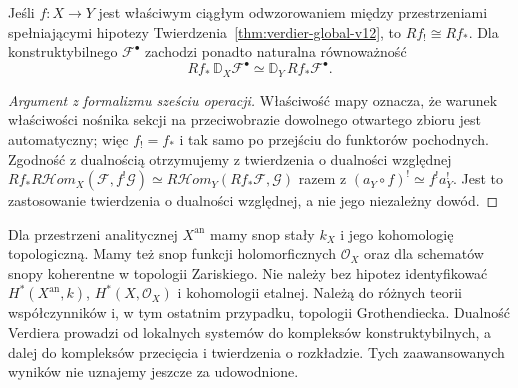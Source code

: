 \begin{stwierdzenie}
\label{prop:verdier-proper-v12}
Jeśli $f:X\to Y$ jest właściwym ciągłym odwzorowaniem
między przestrzeniami spełniającymi hipotezy
Twierdzenia~\ref{thm:verdier-global-v12}, to
$Rf_!\cong Rf_*$. Dla konstruktybilnego
$\mathcal F^\bullet$ zachodzi ponadto naturalna
równoważność
\[
Rf_*\,\mathbb D_X\mathcal F^\bullet
\simeq\mathbb D_Y\,Rf_*\mathcal F^\bullet.
\]
\end{stwierdzenie}
\begin{proof}[Argument z formalizmu sześciu operacji]
Właściwość mapy oznacza, że warunek właściwości
nośnika sekcji na przeciwobrazie dowolnego otwartego
zbioru jest automatyczny; więc $f_!=f_*$ i tak samo
po przejściu do funktorów pochodnych. Zgodność z dualnością
otrzymujemy z twierdzenia o dualności względnej
$Rf_*R\mathcal Hom_X(\mathcal F,f^!\mathcal G)
\simeq R\mathcal Hom_Y(Rf_*\mathcal F,\mathcal G)$
razem z $(a_Y\circ f)^!\simeq f^!a_Y^!$.
Jest to zastosowanie twierdzenia o dualności względnej,
a nie jego niezależny dowód.
\end{proof}

\begin{uwaga}
Dla przestrzeni analitycznej $X^{\mathrm{an}}$ mamy snop
stały $k_X$ i jego kohomologię topologiczną. Mamy też
snop funkcji holomorficznych $\mathcal O_X$ oraz dla
schematów snopy koherentne w topologii Zariskiego.
Nie należy bez hipotez identyfikować
$H^*(X^{\mathrm{an}},k)$, $H^*(X,\mathcal O_X)$
i kohomologii etalnej. Należą do różnych teorii
współczynników i, w tym ostatnim przypadku,
topologii Grothendiecka. Dualność Verdiera prowadzi
od lokalnych systemów do kompleksów konstruktybilnych,
a dalej do kompleksów przecięcia i twierdzenia o rozkładzie.
Tych zaawansowanych wyników nie uznajemy jeszcze za udowodnione.
\end{uwaga}

